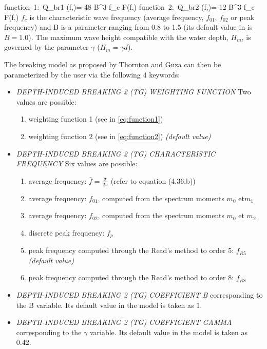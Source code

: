 \bequ
\label{eq:function1} 
\mbox{function 1: }Q_{br1} \left(f,\theta \right)=-48\sqrt{\pi } B^{3} f_{c}  \; F\left(f,\theta \right)
\earr
\eequ
\bequ
{}
\label{eq:function2} 
\mbox{function 2: }Q_{br2} \left(f,\theta \right)=-12\sqrt{\pi } B^{3} f_{c}  \; F\left(f,\theta \right)
\earr
\eequ 
 $f_{c} $ is the characteristic wave frequency (average frequency, $f_{01} $, $f_{02} $ or peak frequency) and B is a parameter ranging from 0.8 to 1.5 (its default value in \tomawac is $B=1.0$). The maximum wave height compatible with the water depth, $H_{m} $, is governed by the parameter $\gamma $ ($H_{m} =\gamma d$).

 The breaking model as proposed by Thornton and Guza can then be parameterized by the user via the following 4 keywords:

 \begin{itemize}
\item \textit{DEPTH-INDUCED BREAKING 2 (TG) WEIGHTING FUNCTION} Two values are possible:
 \begin{enumerate}
 \item weighting function 1 (see in \ref{eq:function1})
 \item weighting function 2 (see in \ref{eq:function2})\textit{ (default value)}
\end{enumerate}
 \item \textit{DEPTH-INDUCED BREAKING 2 (TG) CHARACTERISTIC FREQUENCY} Six values are possible:
 \begin{enumerate}
 \item average frequency: $\bar{f}=\frac{\bar{\sigma }}{2\pi } $  (refer to equation (4.36.b))
 \item average frequency: $f_{01} $, computed from the spectrum moments $m_0$ et$ m_1$
 \item average frequency: $f_{02} $, computed from the spectrum moments $m_0$ et $m_2$
 \item discrete peak frequency: $f_p$
 \item peak frequency computed through the Read's method to order 5: $f_{R5}$ \textit{(default value)}
 \item peak frequency computed through the Read's method to order 8: $f_{R8}$
\end{enumerate}
 \item \textit{ DEPTH-INDUCED BREAKING 2 (TG) COEFFICIENT B} corresponding to the B variable. Its default value in the model is taken as 1.
 \item \textit{DEPTH-INDUCED BREAKING 2 (TG) COEFFICIENT GAMMA} corresponding to the $\gamma $ variable. Its default value in the model is taken as 0.42.
\end{itemize}


